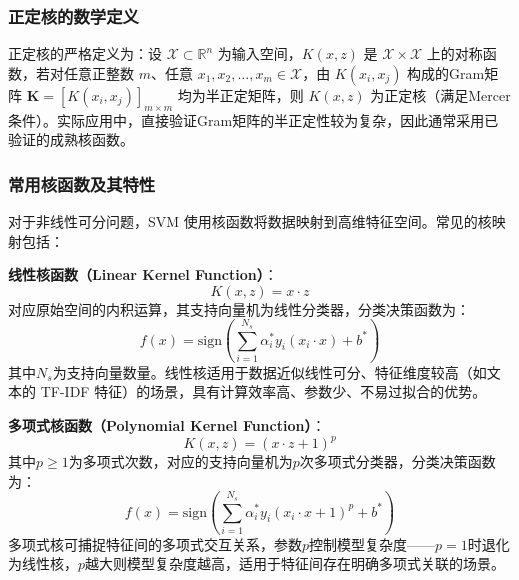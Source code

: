 \documentclass{article}
\newenvironment{solution_cn}{%
  \begin{proof}[解答]%
}{%
  \end{proof}%
}
\begin{document}
\begin{solution_cn}
\subsubsection{正定核的数学定义}

正定核的严格定义为：设 $ \mathcal{X} \subset \mathbb{R}^n $ 为输入空间，$ K(x, z) $ 是 $ \mathcal{X} \times \mathcal{X} $ 上的对称函数，若对任意正整数 $ m $、任意 $ x_1, x_2, \dots, x_m \in \mathcal{X} $，由 $ K(x_i, x_j) $ 构成的Gram矩阵 $ \mathbf{K} = [K(x_i, x_j)]_{m \times m} $ 均为半正定矩阵，则 $ K(x, z) $ 为正定核（满足Mercer条件）。实际应用中，直接验证Gram矩阵的半正定性较为复杂，因此通常采用已验证的成熟核函数。

\subsubsection{常用核函数及其特性}
对于非线性可分问题，SVM 使用核函数将数据映射到高维特征空间。常见的核映射包括：

\textbf{线性核函数（Linear Kernel Function）}：
\begin{equation}
K(x, z) = x \cdot z
\end{equation}
\hspace{2em}对应原始空间的内积运算，其支持向量机为线性分类器，分类决策函数为：
\begin{equation}
f(x) = \text{sign}\left(\sum_{i=1}^{N_s} \alpha_i^* y_i (x_i \cdot x) + b^*\right)
\end{equation}
\hspace{2em}其中$N_s$为支持向量数量。线性核适用于数据近似线性可分、特征维度较高（如文本的 TF-IDF 特征）的场景，具有计算效率高、参数少、不易过拟合的优势。


\textbf{多项式核函数（Polynomial Kernel Function）}：
\begin{equation}
K(x, z) = (x \cdot z + 1)^p
\end{equation}
\hspace{2em}其中$p \geq 1$为多项式次数，对应的支持向量机为$p$次多项式分类器，分类决策函数为：
\begin{equation}
f(x) = \text{sign}\left(\sum_{i=1}^{N_s} \alpha_i^* y_i (x_i \cdot x + 1)^p + b^*\right)
\end{equation}
\hspace{2em}多项式核可捕捉特征间的多项式交互关系，参数$p$控制模型复杂度——$p=1$时退化为线性核，$p$越大则模型复杂度越高，适用于特征间存在明确多项式关联的场景。



\end{solution_cn}
\end{document}
